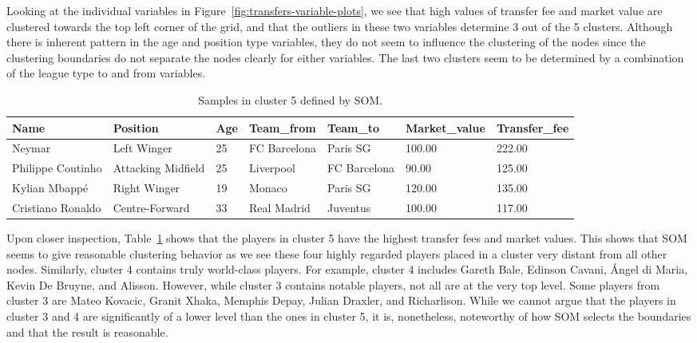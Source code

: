 Looking at the individual variables in Figure~\ref{fig:transfers-variable-plots}, 
we see that high values of transfer fee and market value are clustered towards the top left corner of the grid, 
and that the outliers in these two variables determine 3 out of the 5 clusters. 
Although there is inherent pattern in the age and position type variables, 
they do not seem to influence the clustering of the nodes
since the clustering boundaries do not separate the nodes clearly for either variables.
The last two clusters seem to be determined by a combination of the league type to and from variables. 

\begin{table}[H]
    \centering
    \small
    \begin{tabular}{|lllllll|}
    \hline
        Name & Position & Age & Team\_from & Team\_to & Market\_value & Transfer\_fee \\  \hline
        Neymar & Left Winger &  25 & FC Barcelona & Paris SG  & 100.00 & 222.00  \\ 
        Philippe Coutinho & Attacking Midfield &  25 & Liverpool & FC Barcelona & 90.00 & 125.00 \\ 
        Kylian Mbappé & Right Winger &  19 & Monaco & Paris SG  & 120.00 & 135.00\\ 
        Cristiano Ronaldo & Centre-Forward &  33 & Real Madrid & Juventus & 100.00 & 117.00  \\ 
    \hline
    \end{tabular}
    \caption{Samples in cluster 5 defined by SOM.}
    \label{tab:top_cluster}
\end{table}

Upon closer inspection, 
Table~\ref{tab:top_cluster} shows that the players in cluster 5 
have the highest transfer fees and market values.
This shows that SOM seems to give reasonable clustering behavior
as we see these four highly regarded players placed in a cluster 
very distant from all other nodes.
Similarly, cluster 4 contains truly world-class players.
For example, cluster 4 includes Gareth Bale, Edinson Cavani, \'{A}ngel di Maria, Kevin De Bruyne, and Alisson.
However, while cluster 3 contains notable players, not all are at the very top level.
Some players from cluster 3 are Mateo Kovacic, Granit Xhaka, Memphis Depay, Julian Draxler, and Richarlison.
While we cannot argue that the players in cluster 3 and 4 are significantly of a lower level 
than the ones in cluster 5, 
it is, nonetheless, noteworthy of how SOM selects the boundaries
and that the result is reasonable.

